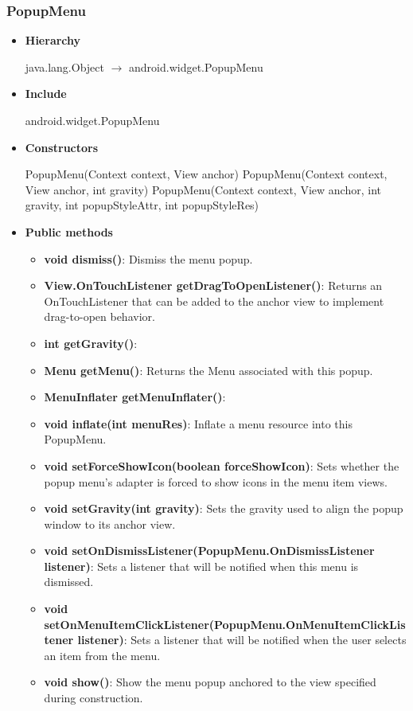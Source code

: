 \documentclass{report}
\begin{document}
\begin{itemize}
    \pagebreak 
    \subsubsection{PopupMenu}
    \begin{itemize}
        \item \textbf{Hierarchy}
            \begin{center}
                java.lang.Object $\to$ android.widget.PopupMenu
            \end{center}
        \item \textbf{Include}
            \bigbreak \noindent 
            \begin{javacode}
            android.widget.PopupMenu
            \end{javacode}
        \item \textbf{Constructors}
            \bigbreak \noindent 
            \begin{javacode}
                PopupMenu(Context context, View anchor)
                PopupMenu(Context context, View anchor, int gravity)
                PopupMenu(Context context, View anchor, int gravity, int popupStyleAttr, int popupStyleRes)
            \end{javacode}
        \item \textbf{Public methods}
            \begin{itemize}
                \item \textbf{void	dismiss()}: Dismiss the menu popup.
                \item \textbf{View.OnTouchListener	getDragToOpenListener()}: Returns an OnTouchListener that can be added to the anchor view to implement drag-to-open behavior.
                \item \textbf{int	getGravity()}:
                \item \textbf{Menu	getMenu()}: Returns the Menu associated with this popup.
                \item \textbf{MenuInflater	getMenuInflater()}:
                \item \textbf{void	inflate(int menuRes)}: Inflate a menu resource into this PopupMenu.
                \item \textbf{void	setForceShowIcon(boolean forceShowIcon)}: Sets whether the popup menu's adapter is forced to show icons in the menu item views.
                \item \textbf{void	setGravity(int gravity)}: Sets the gravity used to align the popup window to its anchor view.
                \item \textbf{void	setOnDismissListener(PopupMenu.OnDismissListener listener)}: Sets a listener that will be notified when this menu is dismissed.
                \item \textbf{void	setOnMenuItemClickListener(PopupMenu.OnMenuItemClickListener listener)}: Sets a listener that will be notified when the user selects an item from the menu.
                \item \textbf{void	show()}: Show the menu popup anchored to the view specified during construction.
            \end{itemize}


\end{itemize}
\end{itemize}
\end{document}
